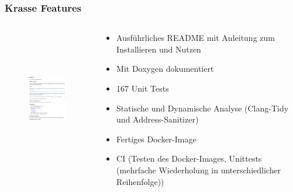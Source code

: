\documentclass[aspectratio=169]{beamer}
\begin{document}
\begin{frame}
    \frametitle{Krasse Features}
    \begin{columns}
        \begin{column}{0.4\textwidth}
            \begin{center}
                \begin{figure}[H]
                    \includegraphics[height=6cm]{doku.png}
                \end{figure}
            \end{center}
        \end{column}
        \begin{column}{0.6\textwidth}
            \begin{itemize}
                \item Ausführliches README mit Anleitung zum Installieren und Nutzen
                    \pause
                \item Mit Doxygen dokumentiert
                    \pause
                \item 167 Unit Tests %
                    \pause
                \item Statische und Dynamische Analyse (Clang-Tidy und Address-Sanitizer)
                    \pause
                \item Fertiges Docker-Image
                    \pause
                \item CI (Testen des Docker-Images, Unittests (mehrfache Wiederholung in unterschiedlicher Reihenfolge))
            \end{itemize}
        \end{column}
    \end{columns}
\end{frame}
\end{document}

